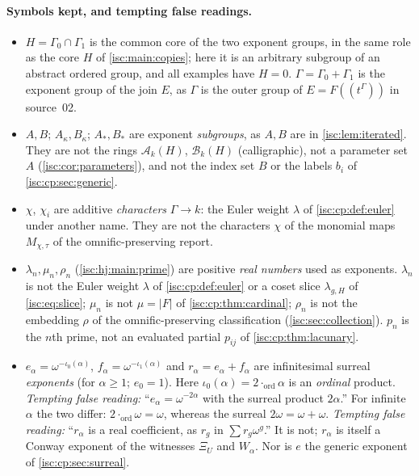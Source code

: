 \documentclass[11pt,letterpaper]{article}
\theoremstyle{definition}
\theoremstyle{remark}
\newcommand{\A}[2]{\mathcal A_{#1}(#2)}
\newcommand{\B}[2]{\mathcal B_{#1}(#2)}
\newcommand{\Ord}{\operatorname{ord}}%
\numberwithin{equation}{section}
\begin{document}
\paragraph{Symbols kept, and tempting false readings.}
\begin{itemize}[leftmargin=*,itemsep=3pt]
\item $H=\Gamma_0\cap\Gamma_1$ is the common core of the two exponent groups,
in the same role as the core $H$ of \cref{isc:main:copies}; here it is an
arbitrary subgroup of an abstract ordered group, and all examples have
$H=0$. $\Gamma=\Gamma_0+\Gamma_1$ is the exponent group of the join $E$,
as $\Gamma$ is the outer group of $E=F((t^\Gamma))$ in source~02.
\item $A,B$; $A_\kappa,B_\kappa$; $A_*,B_*$ are exponent \emph{subgroups},
as $A,B$ are in \cref{isc:lem:iterated}. They are not the rings
$\A{k}{H}$, $\B{k}{H}$ (calligraphic), not a parameter set $A$
(\cref{isc:cor:parameters}), and not the index set $B$ or the labels
$b_i$ of \cref{isc:cp:sec:generic}.
\item $\chi$, $\chi_i$ are additive \emph{characters} $\Gamma\to k$: the
Euler weight $\lambda$ of \cref{isc:cp:def:euler} under another name. They
are not the characters $\chi$ of the monomial maps $M_{\chi,\tau}$ of the
omnific-preserving report.
\item $\lambda_n,\mu_n,\rho_n$ (\cref{isc:hj:main:prime}) are positive
\emph{real numbers} used as exponents. $\lambda_n$ is not the Euler weight
$\lambda$ of \cref{isc:cp:def:euler} or a coset slice $\lambda_{g,H}$ of
\eqref{isc:eq:slice}; $\mu_n$ is not $\mu=|F|$ of
\cref{isc:cp:thm:cardinal}; $\rho_n$ is not the embedding $\rho$ of the
omnific-preserving classification (\cref{isc:sec:collection}). $p_n$ is
the $n$th prime, not an evaluated partial $p_{ij}$ of
\cref{isc:cp:thm:lacunary}.
\item $e_\alpha=\omega^{-\iota_0(\alpha)}$, $f_\alpha=\omega^{-\iota_1(\alpha)}$
and $r_\alpha=e_\alpha+f_\alpha$ are infinitesimal surreal \emph{exponents}
(for $\alpha\ge1$; $e_0=1$). Here $\iota_0(\alpha)=2\cdot_{\Ord}\alpha$ is an
\emph{ordinal} product. \emph{Tempting false reading:}
``$e_\alpha=\omega^{-2\alpha}$ with the surreal product $2\alpha$.'' For
infinite $\alpha$ the two differ: $2\cdot_{\Ord}\omega=\omega$, whereas the
surreal $2\omega=\omega+\omega$.
\emph{Tempting false reading:} ``$r_\alpha$ is a real coefficient, as
$r_g$ in $\sum r_g\omega^g$.'' It is not; $r_\alpha$ is itself a Conway
exponent of the witnesses $\Xi_U$ and $W_\alpha$. Nor is $e$ the generic
exponent of \cref{isc:cp:sec:surreal}.

\end{itemize}
\end{document}
